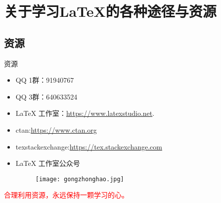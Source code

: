 


\section{关于学习\LaTeX 的各种途径与资源}
\subsection{资源}
	\begin{frame}{资源}
		\begin{itemize}
			\item QQ 1群：91940767
			\item QQ 3群：640633524
			\item LaTeX 工作室：\url{https://www.latexstudio.net}.
			\item ctan:\url{https://www.ctan.org}
			\item texstackexchange:\url{https://tex.stackexchange.com}
			\item LaTeX 工作室公众号	
			\begin{figure}
				\centering
				\texttt{[image: gongzhonghao.jpg]}
			\end{figure}
		\end{itemize}
	
	\phantom{幻影幻影幻影幻影} \textcolor{red}{合理利用资源，永远保持一颗学习的心。}
	\end{frame}